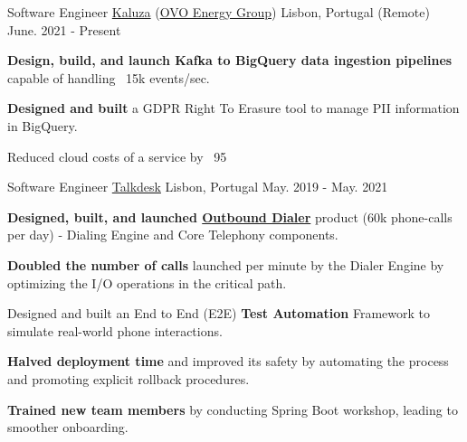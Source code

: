 
\begin{cventries}
  \vspace{-2mm}
  \cventry
    {Software Engineer}
    {\href{https://www.kaluza.com/}{Kaluza} (\href{https://www.ovoenergy.com/}{OVO Energy Group})}
    {Lisbon, Portugal (Remote)}
    {June. 2021 - Present}
    {
      \begin{cvitems}
        \item \textbf{Design, build, and launch Kafka to BigQuery data ingestion pipelines} capable of handling ~15k events/sec.
        \item \textbf{Designed and built} a GDPR Right To Erasure tool to manage PII information in BigQuery.
        \item Reduced cloud costs of a service by ~95%
      \end{cvitems}
      \vspace{4mm}
    }

  \cventry
    {Software Engineer}
    {\href{https://www.talkdesk.com/}{Talkdesk}}
    {Lisbon, Portugal}
    {May. 2019 - May. 2021}
    {
      \begin{cvitems}
        \item \textbf{Designed, built, and launched \href{https://www.youtube.com/watch?v=W9yJ6gi1ggA}{Outbound Dialer}} product (60k phone-calls per day) - Dialing Engine and Core Telephony components.
        \item \textbf{Doubled the number of calls} launched per minute by the Dialer Engine by optimizing the I/O operations in the critical path.
        \item Designed and built an End to End (E2E) \textbf{Test Automation} Framework to simulate real-world phone interactions.
        \item \textbf{Halved deployment time} and improved its safety by automating the process and promoting explicit rollback procedures.
        \item \textbf{Trained new team members} by conducting Spring Boot workshop, leading to smoother onboarding.
      \end{cvitems}
      \vspace{4mm}
    }
    

\end{cventries}
